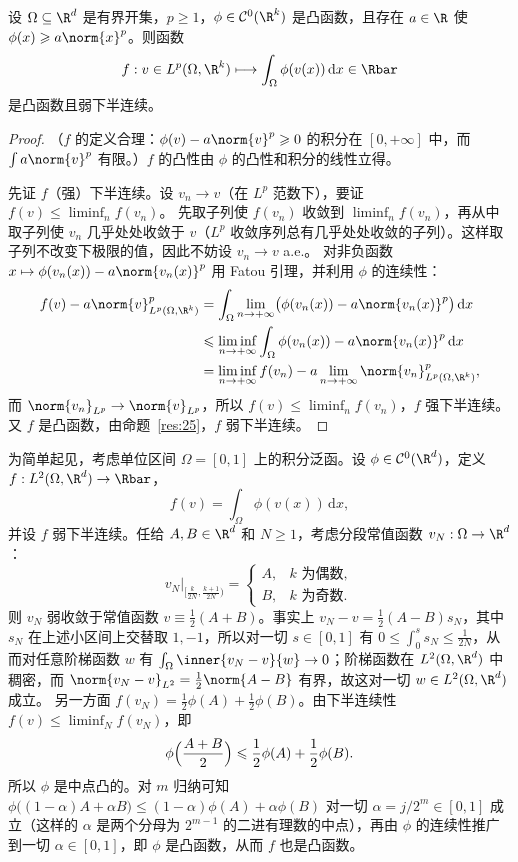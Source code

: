 \begin{proposition}
\label{res:29}
设 $\Omega\subseteq\R^d$ 是有界开集，$p\geqslant1$，$\phi\in\mathcal{C}^0(\R^k)$ 是凸函数，且存在 $a\in\R$ 使 $\phi(x)\geqslant a\norm{x}^p$。则函数
\[
  f:v\in L^p(\Omega,\R^k)\longmapsto\int_\Omega\phi(v(x))\,\mathrm{d}x\in\Rbar
\]
是凸函数且弱下半连续。
\end{proposition}

\begin{proof}
（$f$ 的定义合理：$\phi(v)-a\norm{v}^p\geqslant0$ 的积分在 $[0,+\infty]$ 中，而 $\int a\norm{v}^p$ 有限。）$f$ 的凸性由 $\phi$ 的凸性和积分的线性立得。

先证 $f$（强）下半连续。设 $v_n\to v$（在 $L^p$ 范数下），要证 $f(v)\leqslant\liminf_nf(v_n)$。
先取子列使 $f(v_n)$ 收敛到 $\liminf_nf(v_n)$，再从中取子列使 $v_n$ 几乎处处收敛于 $v$（$L^p$ 收敛序列总有几乎处处收敛的子列）。这样取子列不改变下极限的值，因此不妨设 $v_n\to v$ a.e.。
对非负函数 $x\mapsto\phi(v_n(x))-a\norm{v_n(x)}^p$ 用 Fatou 引理，并利用 $\phi$ 的连续性：
\begin{align*}
  f(v)-a\norm{v}_{L^p(\Omega,\R^k)}^p
  &=\int_\Omega\lim_{n\to+\infty}\bigl(\phi(v_n(x))-a\norm{v_n(x)}^p\bigr)\,\mathrm{d}x\\
  &\leqslant\liminf_{n\to+\infty}\int_\Omega\phi(v_n(x))-a\norm{v_n(x)}^p\,\mathrm{d}x\\
  &=\liminf_{n\to+\infty}f(v_n)-a\lim_{n\to+\infty}\norm{v_n}_{L^p(\Omega,\R^k)}^p ,
\end{align*}
而 $\norm{v_n}_{L^p}\to\norm{v}_{L^p}$，所以 $f(v)\leqslant\liminf_nf(v_n)$，$f$ 强下半连续。
又 $f$ 是凸函数，由命题~\ref{res:25}，$f$ 弱下半连续。
\end{proof}

\begin{remark}[弱下半连续的积分泛函必是凸的]
\label{rem:9}
为简单起见，考虑单位区间 $\Omega=[0,1]$ 上的积分泛函。设 $\phi\in\mathcal{C}^0(\R^d)$，定义 $f:L^2(\Omega,\R^d)\to\Rbar$，
\[
  f(v)=\int_\Omega\phi(v(x))\,\mathrm{d}x ,
\]
并设 $f$ 弱下半连续。任给 $A,B\in\R^d$ 和 $N\geqslant1$，考虑分段常值函数 $v_N:\Omega\to\R^d$：
\[
  v_N\big|_{[\frac{k}{2N},\frac{k+1}{2N})}=
  \begin{cases}
    A, & k\text{ 为偶数},\\
    B, & k\text{ 为奇数}.
  \end{cases}
\]
则 $v_N$ 弱收敛于常值函数 $v\equiv\frac12(A+B)$。事实上 $v_N-v=\frac12(A-B)s_N$，其中 $s_N$ 在上述小区间上交替取 $1,-1$，所以对一切 $s\in[0,1]$ 有 $0\leqslant\int_0^ss_N\leqslant\frac1{2N}$，从而对任意阶梯函数 $w$ 有 $\int_\Omega\inner{v_N-v}{w}\to0$；阶梯函数在 $L^2(\Omega,\R^d)$ 中稠密，而 $\norm{v_N-v}_{L^2}=\frac12\norm{A-B}$ 有界，故这对一切 $w\in L^2(\Omega,\R^d)$ 成立。
另一方面 $f(v_N)=\frac12\phi(A)+\frac12\phi(B)$。由下半连续性 $f(v)\leqslant\liminf_Nf(v_N)$，即
\[
  \phi\Bigl(\frac{A+B}{2}\Bigr)\leqslant\frac12\phi(A)+\frac12\phi(B).
\]
所以 $\phi$ 是中点凸的。对 $m$ 归纳可知 $\phi\bigl((1-\alpha)A+\alpha B\bigr)\leqslant(1-\alpha)\phi(A)+\alpha\phi(B)$ 对一切 $\alpha=j/2^m\in[0,1]$ 成立（这样的 $\alpha$ 是两个分母为 $2^{m-1}$ 的二进有理数的中点），再由 $\phi$ 的连续性推广到一切 $\alpha\in[0,1]$，即 $\phi$ 是凸函数，从而 $f$ 也是凸函数。
\end{remark}

